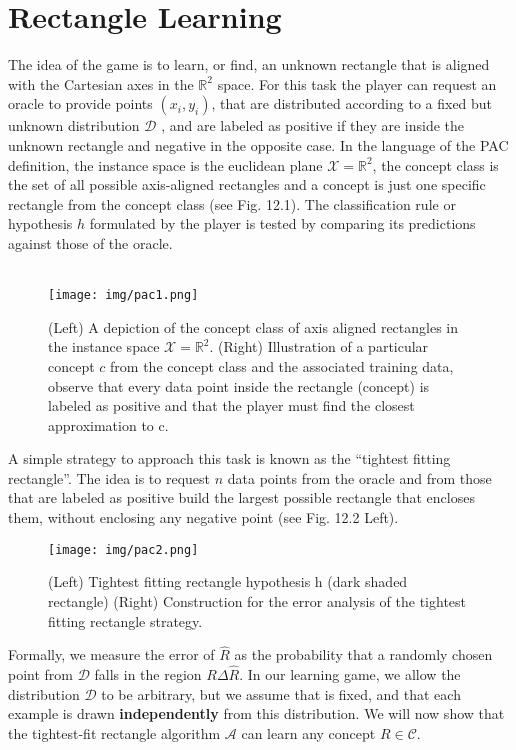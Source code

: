 \documentclass[twoside]{article}
\begin{document}
 \section{Rectangle Learning}

The idea of the game is to learn, or find, an
unknown rectangle that is aligned with the Cartesian axes in the $\mathbb{R}^2$
space. For this
task the player can request an oracle to provide points $(x_{i}
, y_{i})$, that are distributed
according to a fixed but unknown distribution $\mathbf{\mathcal{D}}$ , and are labeled as positive if they are inside the unknown rectangle and negative in the opposite case. In the language
of the PAC definition, the instance space is the euclidean plane $\mathbf{\mathcal{X}}= \mathbb{R}^2$, the concept
class is the set of all possible axis-aligned rectangles and a concept is just one specific
rectangle from the concept class (see Fig. 12.1). The classification rule or hypothesis
$h$ formulated by the player is tested by comparing its predictions against those of
the oracle.\\ \\ 
\begin{figure}[h]
\centering

\texttt{[image: img/pac1.png]}
\caption{(Left) A depiction of the concept class of axis aligned rectangles in the instance
space $\mathcal{X} = \mathbb{R}^2$. (Right) Illustration of a particular concept $c$ from the concept class and
the associated training data, observe that every data point inside the rectangle (concept) is
labeled as positive and that the player must find the closest approximation to c.}
\end{figure}

A simple strategy to approach this task is known as the “tightest fitting rectangle”. The idea is to request $n$ data points from the oracle and from those that are labeled as positive build the largest possible rectangle that encloses them, without enclosing any negative point (see Fig. 12.2 Left).
\begin{figure}[h]
\centering
\texttt{[image: img/pac2.png]}
\caption{(Left) Tightest fitting rectangle hypothesis h (dark shaded rectangle) (Right)
Construction for the error analysis of the tightest fitting rectangle strategy.}
\end{figure}

Formally, we measure the error of $\hat{R}$ as the probability that a randomly chosen point from $\mathcal{D}$ falls in the region $R \Delta \hat{R}$. In our learning game, we allow the distribution $\mathcal{D}$ to be arbitrary, but we assume that is fixed, and that each example is drawn \textbf{independently} from this distribution. We will now show that the tightest-fit rectangle algorithm $\mathcal{A}$ can learn any concept $ R \in \mathcal{C}$.\\\\
\end{document}
